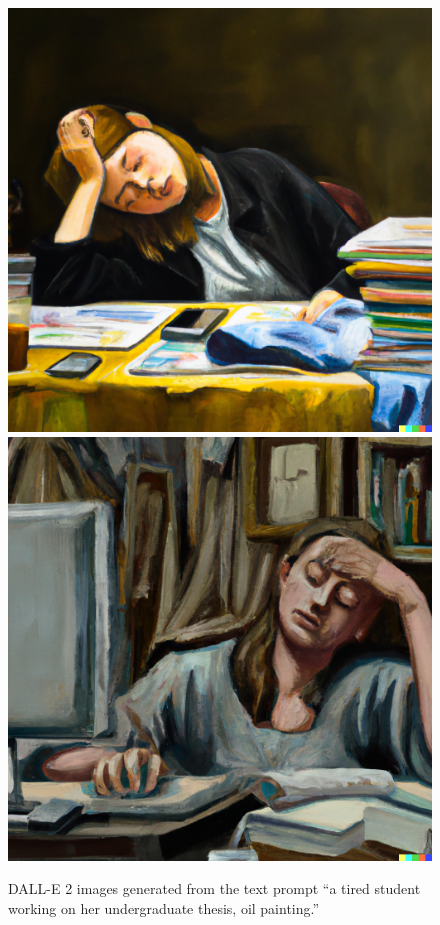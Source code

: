 \documentclass[12pt,twoside]{reedthesis}
\begin{document}
\begin{figure}
\centering
\includegraphics[scale=0.2]{DALLE_tired_student}
\includegraphics[scale=0.2]{DALLE_tired_student1.png}
\caption{DALL-E 2 images generated from the text prompt “a tired student working on her undergraduate thesis, oil painting.”}
\label{fig-tired-student}
\end{figure}
\end{document}
